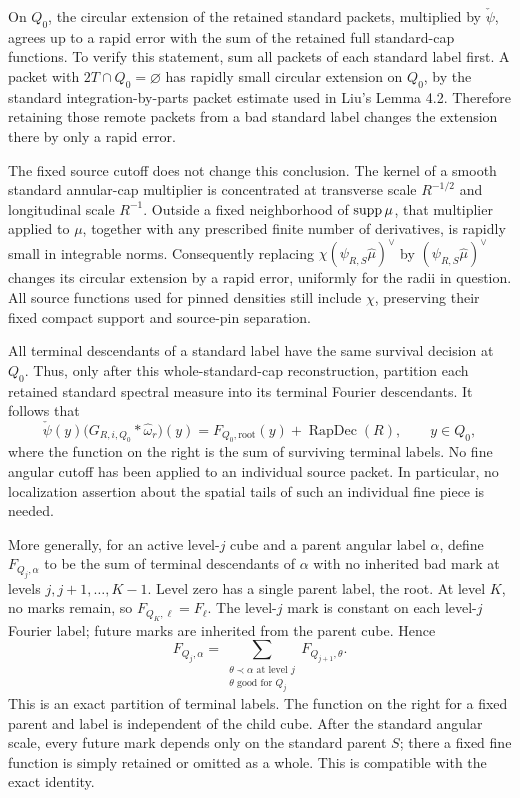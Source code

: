 On \(Q_0\), the circular extension of the retained standard packets,
multiplied by \(\check\psi\), agrees up to a rapid error with the sum
of the retained full standard-cap functions. To verify this statement,
sum all packets of each standard label first. A packet with
\(2T\cap Q_0=\varnothing\) has rapidly small circular extension on
\(Q_0\), by the standard integration-by-parts packet estimate used in
Liu's Lemma 4.2. Therefore retaining those remote packets from a bad
standard label changes the extension there by only a rapid error.

The fixed source cutoff does not change this conclusion. The kernel of
a smooth standard annular-cap multiplier is concentrated at transverse
scale \(R^{-1/2}\) and longitudinal scale \(R^{-1}\). Outside a fixed
neighborhood of \(\operatorname{supp}\mu\), that multiplier applied to \(\mu\),
together with any prescribed finite number of derivatives, is rapidly
small in integrable norms. Consequently replacing
\(\chi(\psi_{R,S}\widehat\mu)^\vee\) by
\((\psi_{R,S}\widehat\mu)^\vee\) changes its circular extension by a
rapid error, uniformly for the radii in question. All source functions
used for pinned densities still include \(\chi\), preserving their
fixed compact support and source-pin separation.

All terminal descendants of a standard label have the same survival
decision at \(Q_0\). Thus, only after this whole-standard-cap
reconstruction, partition each retained standard spectral measure into
its terminal Fourier descendants. It follows that
\begin{equation}\label{uf:initialidentity}
 \check\psi(y)
 \big(G_{R,i,Q_0}*\widehat\omega_r\big)(y)
 =F_{Q_0,\mathrm{root}}(y)+\operatorname{RapDec}(R),
 \qquad y\in Q_0,
\end{equation}
where the function on the right is the sum of surviving terminal labels.
No fine angular cutoff has been applied to an individual source packet.
In particular, no localization assertion about the spatial tails of such
an individual fine piece is needed.

More generally, for an active level-\(j\) cube and a parent angular
label \(\alpha\), define \(F_{Q_j,\alpha}\) to be the sum of terminal
descendants of \(\alpha\) with no inherited bad mark at levels
\(j,j+1,\ldots,K-1\). Level zero has a single parent label, the root.
At level \(K\), no marks remain, so \(F_{Q_K,\ell}=F_\ell\).
The level-\(j\) mark is constant on each level-\(j\) Fourier label;
future marks are inherited from the parent cube. Hence
\begin{equation}\label{fprof:identity}
 F_{Q_j,\alpha}
 =\sum_{\substack{\theta\prec\alpha\text{ at level }j\\
                    \theta\text{ good for }Q_j}}
       F_{Q_{j+1},\theta}.
\end{equation}
This is an exact partition of terminal labels. The function on the right
for a fixed parent and label is independent of the child cube. After
the standard angular scale, every future mark depends only on the
standard parent \(S\); there a fixed fine function is simply retained
or omitted as a whole. This is compatible with the exact identity.

